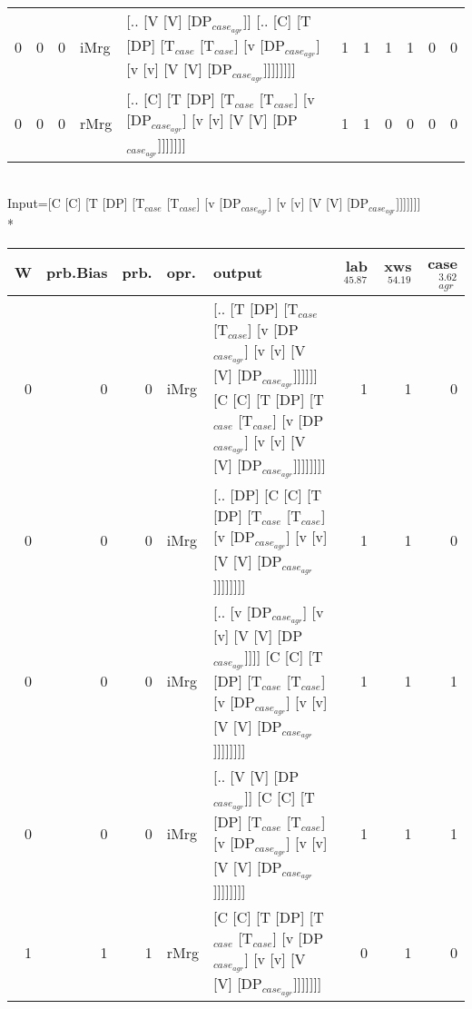 \begin{tabularx}{\linewidth}{rrrlXrrrrrr}
   0 &       0 &   0 & iMrg & [.. [V [V] [DP$_{case_{agr}}$]] [.. [C] [T [DP] [T$_{case}$ [T$_{case}$] [v [DP$_{case_{agr}}$] [v [v] [V [V] [DP$_{case_{agr}}$]]]]]]]]                                                      &             1 &             1 &                  1 &            1 &              0 &             0 \\
   0 &       0 &   0 & rMrg & [.. [C] [T [DP] [T$_{case}$ [T$_{case}$] [v [DP$_{case_{agr}}$] [v [v] [V [V] [DP$_{case_{agr}}$]]]]]]]                                                                                 &             1 &             1 &                  0 &            0 &              0 &             0 \\
\hline
\end{tabularx}\endgroup\\
\begingroup\scriptsize Input=[C [C] [T [DP] [T$_{case}$ [T$_{case}$] [v [DP$_{case_{agr}}$] [v [v] [V [V] [DP$_{case_{agr}}$]]]]]]]\\*
\begin{tabularx}{\linewidth}{rrrlXrrr}
\hline
   W &   prb.Bias &   prb. & opr.   & output                                                                                                                                                             &   lab$^{45.87}$ &   xws$^{54.19}$ &   case$_{agr}^{3.62}$ \\
\hline
   0 &       0 &   0 & iMrg & [.. [T [DP] [T$_{case}$ [T$_{case}$] [v [DP$_{case_{agr}}$] [v [v] [V [V] [DP$_{case_{agr}}$]]]]]] [C [C] [T [DP] [T$_{case}$ [T$_{case}$] [v [DP$_{case_{agr}}$] [v [v] [V [V] [DP$_{case_{agr}}$]]]]]]]] &             1 &             1 &                  0 \\
   0 &       0 &   0 & iMrg & [.. [DP] [C [C] [T [DP] [T$_{case}$ [T$_{case}$] [v [DP$_{case_{agr}}$] [v [v] [V [V] [DP$_{case_{agr}}$]]]]]]]]                                                                       &             1 &             1 &                  0 \\
   0 &       0 &   0 & iMrg & [.. [v [DP$_{case_{agr}}$] [v [v] [V [V] [DP$_{case_{agr}}$]]]] [C [C] [T [DP] [T$_{case}$ [T$_{case}$] [v [DP$_{case_{agr}}$] [v [v] [V [V] [DP$_{case_{agr}}$]]]]]]]]                            &             1 &             1 &                  1 \\
   0 &       0 &   0 & iMrg & [.. [V [V] [DP$_{case_{agr}}$]] [C [C] [T [DP] [T$_{case}$ [T$_{case}$] [v [DP$_{case_{agr}}$] [v [v] [V [V] [DP$_{case_{agr}}$]]]]]]]]                                                      &             1 &             1 &                  1 \\
   1 &       1 &   1 & rMrg & [C [C] [T [DP] [T$_{case}$ [T$_{case}$] [v [DP$_{case_{agr}}$] [v [v] [V [V] [DP$_{case_{agr}}$]]]]]]]                                                                                 &             0 &             1 &                  0 \\
\hline
\end{tabularx}\endgroup\\


